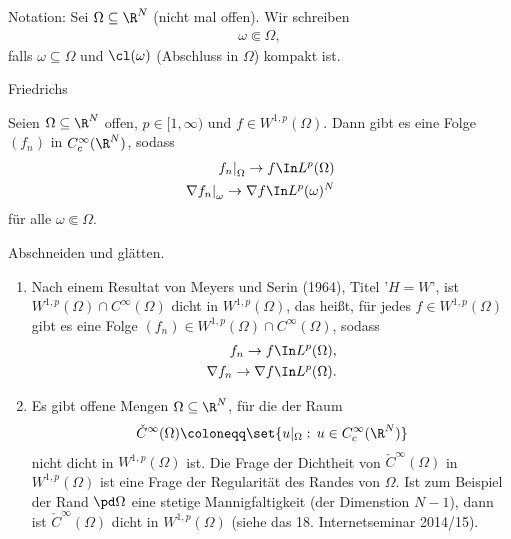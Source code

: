 Notation: Sei $\Omega \subseteq \R^{N}$ (nicht mal offen). Wir schreiben
\begin{align*}
  \omega \Subset \Omega, 
\end{align*}
falls $\omega \subseteq \Omega$ und $\cl(\omega)$ (Abschluss in $\Omega$) kompakt ist. 
\begin{theorem} Friedrichs


  Seien $\Omega \subseteq \R^{N}$ offen, $p \in [1, \infty)$ und $f \in W^{1, p}(\Omega)$. Dann gibt es eine Folge $(f_{n})$ in $C_{c}^{\infty}(\R^{N})$, sodass
  \begin{align*}
    \left. f_{n}\right|_{\Omega} \to f \In L^{p}(\Omega)\\
    \left.\nabla f_{n}\right|_{\omega} \to \nabla f \In L^{p}(\omega)^{N} 
  \end{align*}
für alle $\omega \Subset \Omega$.
\end{theorem}
\begin{beweis}
  Abschneiden und glätten. 
\end{beweis}
\begin{bemerkung}
  \begin{enumerate}
  \item Nach einem Resultat von Meyers und Serin (1964), Titel '$H = W$', ist $W^{1, p}(\Omega) \cap C^{\infty}(\Omega)$ dicht in $W^{1, p}(\Omega)$, das heißt, für jedes $f \in W^{1, p}(\Omega)$ gibt es eine Folge $(f_{n}) \in W^{1, p}(\Omega) \cap C^{\infty}(\Omega)$, sodass
    \begin{align*}
      f_{n} \to f &\In L^{p}(\Omega), \\
      \nabla f_{n} \to \nabla f &\In L^{p}(\Omega).
    \end{align*}
\item Es gibt offene Mengen $\Omega \subseteq \R^{N}$, für die der Raum
  \begin{align*}
    \check C^{\infty}(\Omega) \coloneqq \set{u|_{\Omega}: \, u \in C_{c}^{\infty}(\R^{N})}
  \end{align*}
nicht dicht in $W^{1, p}(\Omega)$ ist. Die Frage der Dichtheit von $\check C^{\infty}(\Omega)$ in $W^{1, p}(\Omega)$ ist eine Frage der Regularität des Randes von $\Omega$. Ist zum Beispiel der Rand $\pd \Omega$ eine stetige Mannigfaltigkeit (der Dimenstion $N-1$), dann ist $\check C^{\infty}(\Omega)$ dicht in $W^{1, p}(\Omega)$ (siehe das 18. Internetseminar 2014/15). 
  \end{enumerate}
\end{bemerkung}


